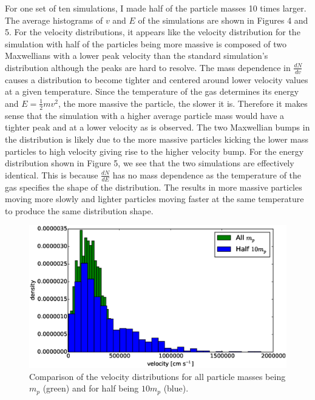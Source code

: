 \documentclass[12pt]{amsart}
\begin{document}
For one set of ten simulations, I made half of the particle masses 10 times larger.  The average histograms of $v$ and $E$ of the simulations are shown in Figures 4 and 5.  For the velocity distributions, it appears like the velocity distribution for the simulation with half of the particles being more massive is composed of two Maxwellians with a lower peak velocity than the standard simulation's distribution although the peaks are hard to resolve.  The mass dependence in $\frac{dN}{dv}$ causes a distribution to become tighter and centered around lower velocity values at a given temperature.  Since the temperature of the gas determines its energy and $E = \frac{1}{2}mv^2$, the more massive the particle, the slower it is.  Therefore it makes sense that the simulation with a higher average particle mass would have a tighter peak and at a lower velocity as is observed.  The two Maxwellian bumps in the distribution is likely due to the more massive particles kicking the lower mass particles to high velocity giving rise to the higher velocity bump.  For the energy distribution shown in Figure 5, we see that the two simulations are effectively identical.  This is because $\frac{dN}{dE}$ has no mass dependence as the temperature of the gas specifies the shape of the distribution.  The results in more massive particles moving more slowly and lighter particles moving faster at the same temperature to produce the same distribution shape.

\begin{figure}[h!]
  \centering
    \includegraphics[width=1.0\textwidth]{vel_comp.eps}
    \caption{Comparison of the velocity distributions for all particle masses being $m_p$ (green) and for half being $10m_p$ (blue).}
\end{figure}
\end{document}
